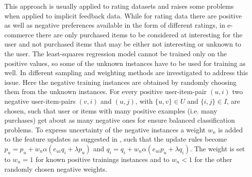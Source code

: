 \documentclass[10pt]{reportMaster}
\begin{document}
This approach is usually applied to rating datasets and raises some problems when applied to implicit feedback data.
While for rating data there are positive as well as negative preferences available in the form of different ratings, in e-commerce there are only purchased items to be considered at interesting for the user and not purchased items that may be either not interesting or unknown to the user.
The least-squares regression model cannot be trained only on the positive values, so some of the unknown instances have to be used for training as well.
In \cite{occf} different sampling and weighting methods are investigated to address this issue.
Here the negative training instances are obtained by randomly choosing them from the unknown instances.
For every positive user-item-pair $(u, i)$ two negative user-item-pairs $(v, i)$ and $(u,j)$, with $\{u, v\} \in U$ and $\{i, j\} \in I$, are chosen, such that user or items with many positive examples (i.e. many purchases) get about as many negative ones for ensure balanced classification problems. %
To express uncertainty of the negative instances a weight $w_n$ is added to the feature updates as suggested in \cite{occf}, such that the update rules become $p_u = p_u + w_n \alpha (e_{ui} q_i + \lambda p_u)$ and $q_i = q_i + w_n \alpha (e_{ui} p_u + \lambda q_i)$. %
The weight is set to $w_n = 1$ for known positive trainings instances and to $w_n < 1$ for the other randomly chosen negative weights. %




\end{document}
